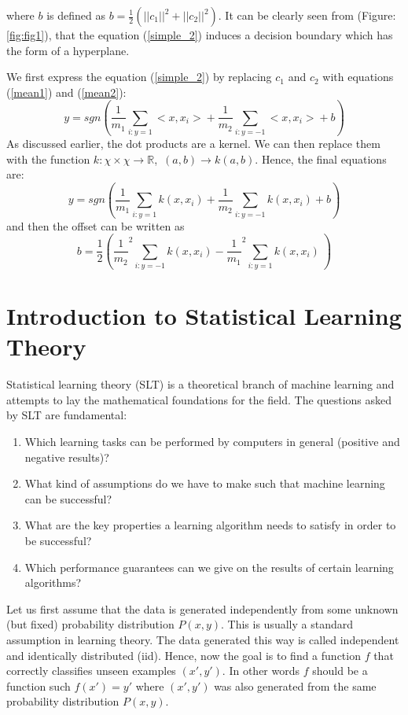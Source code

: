 \documentclass{article}
\begin{document}
where $b$ is defined as $b = \frac{1}{2}(||c_1||^2 + ||c_2||^2)$. It can be clearly seen from (Figure:\ref{fig:fig1}), that the equation (\ref{simple_2}) induces a decision boundary which has the form of a hyperplane.

We first express the equation (\ref{simple_2}) by replacing $c_1$ and $c_2$ with equations (\ref{mean1}) and (\ref{mean2}):
\begin{equation}
    y = sgn(\frac{1}{m_1} \sum_{i:y = 1}{<x,x_i>} + \frac{1}{m_2}\sum_{i:y = -1}{<x,x_i>} + b) \nonumber
\end{equation}
As discussed earlier, the dot products are a kernel. We can then replace them with the function $k: \chi \times \chi \rightarrow \mathbb{R}$,\ $(a,b) \rightarrow k(a,b)$. Hence, the final equations are:
\begin{equation}
    y = sgn(\frac{1}{m_1} \sum_{i:y = 1}{k(x,x_i)} + \frac{1}{m_2}\sum_{i:y = -1}{k(x,x_i)} + b) \nonumber
\end{equation} and then the offset can be written as 
\begin{equation}
    b = \frac{1}{2} (\frac{1}{m_2}^2 \sum_{i:y = -1}{k(x,x_i)} - \frac{1}{m_1}^2 \sum_{i:y = 1}{k(x,x_i)} \ ) \nonumber
\end{equation}

\section{Introduction to Statistical Learning Theory}
 Statistical learning theory (SLT) is a theoretical branch of machine learning and attempts to lay the mathematical foundations for the field. \cite{intro_stat} The questions asked by SLT are fundamental:
\begin{enumerate}
    \item Which learning tasks can be performed by computers in general (positive and negative results)?
\item What kind of assumptions do we have to make such that machine learning can be successful?
\item What are the key properties a learning algorithm needs to satisfy in order to be successful?
\item Which performance guarantees can we give on the results of certain learning algorithms?
\end{enumerate}
Let us first assume that the data is generated independently from some unknown (but
fixed) probability distribution $P(x, y)$. This is usually a standard assumption in learning theory. The data generated this way is called independent and
identically distributed (iid). Hence, now the goal is to find a function $f$ that correctly classifies unseen examples $(x', y')$. In other words $f$ should be a function such $f(x') = y'$ where $(x', y')$ was also generated from the same probability distribution $P(x, y)$.
\end{document}
